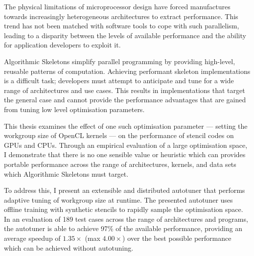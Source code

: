 The physical limitations of microprocessor design have forced
manufactures towards increasingly heterogeneous architectures to
extract performance. This trend has not been matched with software
tools to cope with such parallelism, leading to a disparity between
the levels of available performance and the ability for application
developers to exploit it.

Algorithmic Skeletons simplify parallel programming by providing
high-level, reusable patterns of computation. Achieving performant
skeleton implementations is a difficult task; developers must attempt
to anticipate and tune for a wide range of architectures and use
cases. This results in implementations that target the general case
and cannot provide the performance advantages that are gained from
tuning low level optimisation parameters.

%
This thesis examines the effect of one such optimisation parameter ---
setting the workgroup size of OpenCL kernels --- on the performance of
stencil codes on GPUs and CPUs. Through an empirical evaluation of a
large optimisation space, I demonstrate that there is no one
sensible value or heuristic which can provides portable performance
across the range of architectures, kernels, and data sets which
Algorithmic Skeletons must target.

%
To address this, I present an extensible and distributed autotuner
that performs adaptive tuning of workgroup size at runtime. The
presented autotuner uses offline training with synthetic stencils to
rapidly sample the optimisation space. In an evaluation of 189 test
cases across the range of architectures and programs, the autotuner is
able to achieve 97\% of the available performance, providing an
average speedup of $1.35\times$ (max $4.00\times$) over the best
possible performance which can be achieved without autotuning.

